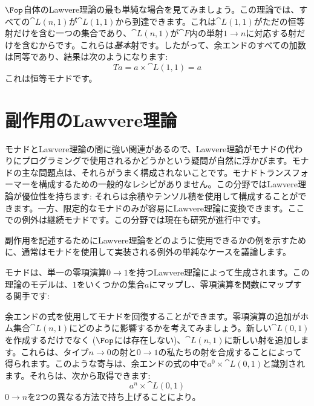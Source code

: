 $\Fop$自体のLawvere理論の最も単純な場合を見てみましょう。この理論では、すべての$\cat{L}(n, 1)$が$\cat{L}(1, 1)$から到達できます。これは$\cat{L}(1, 1)$がただの恒等射だけを含む一つの集合であり、$\cat{L}(n, 1)$が$\cat{F}$内の単射$1 \to n$に対応する射だけを含むからです。これらは\emph{基本}射です。したがって、余エンドのすべての加数は同等であり、結果は次のようになります: 
\[T a = a \times \cat{L}(1, 1) = a\]
これは恒等モナドです。

\section{副作用のLawvere理論}

モナドとLawvere理論の間に強い関連があるので、Lawvere理論がモナドの代わりにプログラミングで使用されるかどうかという疑問が自然に浮かびます。モナドの主な問題点は、それらがうまく構成されないことです。モナドトランスフォーマーを構成するための一般的なレシピがありません。この分野ではLawvere理論が優位性を持ちます: それらは余積やテンソル積を使用して構成することができます。一方、限定的なモナドのみが容易にLawvere理論に変換できます。ここでの例外は継続モナドです。この分野では現在も研究が進行中です。

副作用を記述するためにLawvere理論をどのように使用できるかの例を示すために、通常はモナドを使用して実装される例外の単純なケースを議論します。

モナドは、単一の零項演算$0 \to 1$を持つLawvere理論によって生成されます。この理論のモデルは、$1$をいくつかの集合$a$にマップし、零項演算を関数にマップする関手です: 

余エンドの式を使用してモナドを回復することができます。零項演算の追加がホム集合$\cat{L}(n, 1)$にどのように影響するかを考えてみましょう。新しい$\cat{L}(0, 1)$を作成するだけでなく ($\Fop$には存在しない)、$\cat{L}(n, 1)$に新しい射を追加します。これらは、タイプ$n \to 0$の射と$0 \to 1$の私たちの射を合成することによって得られます。このような寄与は、余エンドの式の中で$a^0 \times \cat{L}(0, 1)$と識別されます。それらは、次から取得できます: 
\[a^n \times \cat{L}(0, 1)\]
$0 \to n$を2つの異なる方法で持ち上げることにより。

\begin{figure}[H]
  \centering
\end{figure}

